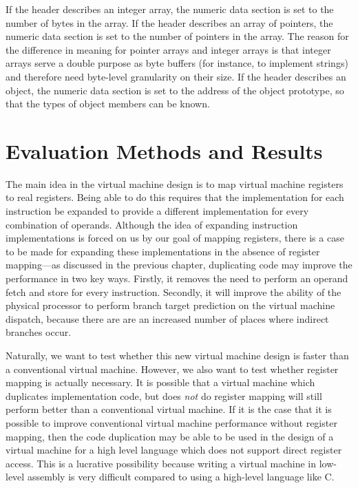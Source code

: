 		If the header describes an integer array, the numeric data section is set to the number of bytes in the array. If the header describes an array of pointers, the numeric data section is set to the number of pointers in the array. The reason for the difference in meaning for pointer arrays and integer arrays is that integer arrays serve a double purpose as byte buffers (for instance, to implement strings) and therefore need byte-level granularity on their size. If the header describes an object, the numeric data section is set to the address of the object prototype, so that the types of object members can be known.

\chapter{Evaluation Methods and Results}
	The main idea in the virtual machine design is to map virtual machine registers to real registers. Being able to do this requires that the implementation for each instruction be expanded to provide a different implementation for every combination of operands. Although the idea of expanding instruction implementations is forced on us by our goal of mapping registers, there is a case to be made for expanding these implementations in the absence of register mapping---as discussed in the previous chapter, duplicating code may improve the performance in two key ways. Firstly, it removes the need to perform an operand fetch and store for every instruction. Secondly, it will improve the ability of the physical processor to perform branch target prediction on the virtual machine dispatch, because there are are an increased number of places where indirect branches occur.
	
	Naturally, we want to test whether this new virtual machine design is faster than a conventional virtual machine. However, we also want to test whether register mapping is actually necessary. It is possible that a virtual machine which duplicates implementation code, but does \emph{not} do register mapping will still perform better than a conventional virtual machine. If it is the case that it is possible to improve conventional virtual machine performance without register mapping, then the code duplication may be able to be used in the design of a virtual machine for a high level language which does not support direct register access. This is a lucrative possibility because writing a virtual machine in low-level assembly is very difficult compared to using a high-level language like C.
	
